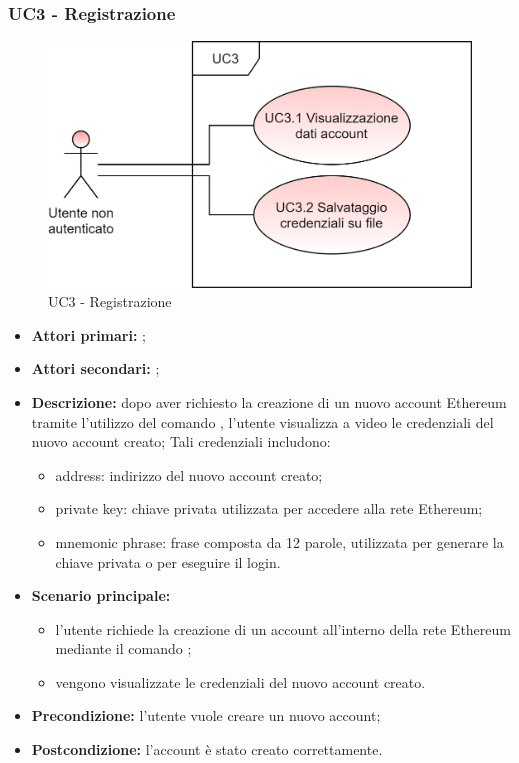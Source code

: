 \subsubsection{UC3 - Registrazione}
\begin{figure}[H]
	\centering
	\includegraphics[scale=\ucs]{./res/img/UC3.png}
	\caption {UC3 - Registrazione}
\end{figure}
\begin{itemize}
	\item \textbf{Attori primari:} \una{};
	\item \textbf{Attori secondari:} \re{};
	\item \textbf{Descrizione:} dopo aver richiesto la creazione di un nuovo account Ethereum tramite l’utilizzo del comando \signup{}, l’utente visualizza a video le credenziali del nuovo account creato; Tali credenziali includono:
	\begin{itemize}
		\item address: indirizzo del nuovo account creato;
		\item private key: chiave privata utilizzata per accedere alla rete Ethereum;
		\item mnemonic phrase: frase composta da 12 parole, utilizzata per generare la chiave privata o per eseguire il login.
	\end{itemize}
	\item \textbf{Scenario principale:}
	\begin{itemize}
		\item l’utente richiede la creazione di un account all’interno della rete Ethereum mediante il comando \signup{};
		\item vengono visualizzate le credenziali del nuovo account creato. 
	\end{itemize}
	\item \textbf{Precondizione:} l'utente vuole creare un nuovo account; 
	\item \textbf{Postcondizione:} l’account è stato creato correttamente. 
\end{itemize}